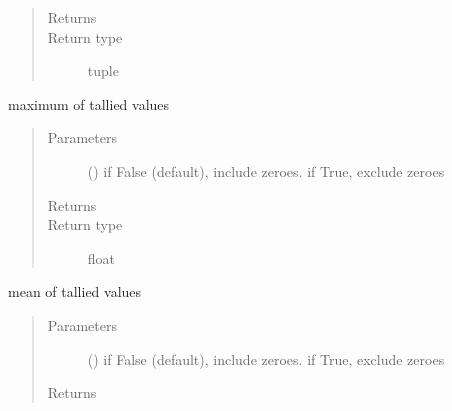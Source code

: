 \documentclass[letterpaper,10pt,english]{sphinxmanual}
\begin{document}
\begin{fulllineitems}
\begin{fulllineitems}
\begin{quote}
\begin{description}
\item[{Returns}] \leavevmode
{}

\item[{Return type}] \leavevmode
tuple

\end{description}\end{quote}

\end{fulllineitems}


\begin{fulllineitems}
\label{\detokenize{Reference:salabim.Monitor.maximum}}
maximum of tallied values
\begin{quote}\begin{description}
\item[{Parameters}] \leavevmode
{} () \textendash{} if False (default), include zeroes. if True, exclude zeroes

\item[{Returns}] \leavevmode
{}

\item[{Return type}] \leavevmode
float

\end{description}\end{quote}

\end{fulllineitems}


\begin{fulllineitems}
\label{\detokenize{Reference:salabim.Monitor.mean}}
mean of tallied values
\begin{quote}\begin{description}
\item[{Parameters}] \leavevmode
{} () \textendash{} if False (default), include zeroes. if True, exclude zeroes

\item[{Returns}] \leavevmode
{}


\end{description}
\end{quote}
\end{fulllineitems}
\end{fulllineitems}
\end{document}
